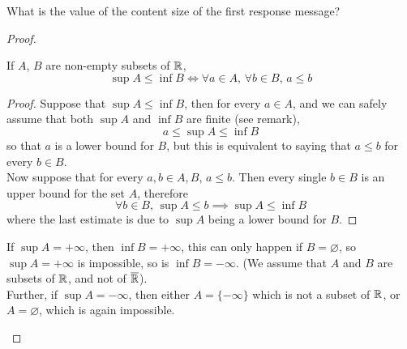\documentclass[../../main.tex]{subfiles}
\begin{document}
\begin{wts}
What is the value of the content size of the first response message?
\end{wts}
\begin{proof}
\begin{wts}\label{lemma: a leq b for every a and b}
    If $A$, $B$ are non-empty subsets of $\mathbb{R}$,
    \[
    \sup A\leq \inf B \iff \forall a\in A,\,\forall b\in B,\, a\leq b
    \]
\end{wts}
\begin{proof}
    Suppose that $\sup A\leq \inf B$, then for every $a\in A$, and we can safely assume that both $\sup A$ and $\inf B$ are finite (see remark),
    \[
    a\leq \sup A\leq \inf B
    \]
    so that $a$ is a lower bound for $B$, but this is equivalent to saying that $a\leq b$ for every $b\in B$.\\
    
    Now suppose that for every $a,b\in A,B$, $a\leq b$. Then every single $b\in B$ is an upper bound for the set $A$, therefore
    \[
    \forall b\in B,\, \sup A\leq b\implies \sup A\leq \inf B
    \]
    where the last estimate is due to $\sup A$ being a lower bound for $B$.
\end{proof}
\begin{remark}
    If $\sup A = +\infty$, then $\inf B = +\infty$, this can only happen if $B=\varnothing$, so $\sup A = +\infty$ is impossible, so is $\inf B = -\infty$. (We assume that $A$ and $B$ are subsets of $\mathbb{R}$, and not of $\overline{\mathbb{R}}$).\\
    
    Further, if $\sup A = -\infty$, then either $A=\{-\infty\}$ which is not a subset of $\mathbb{R}$, or $A=\varnothing$, which is again impossible.
\end{remark}
\end{proof}
\end{document}
